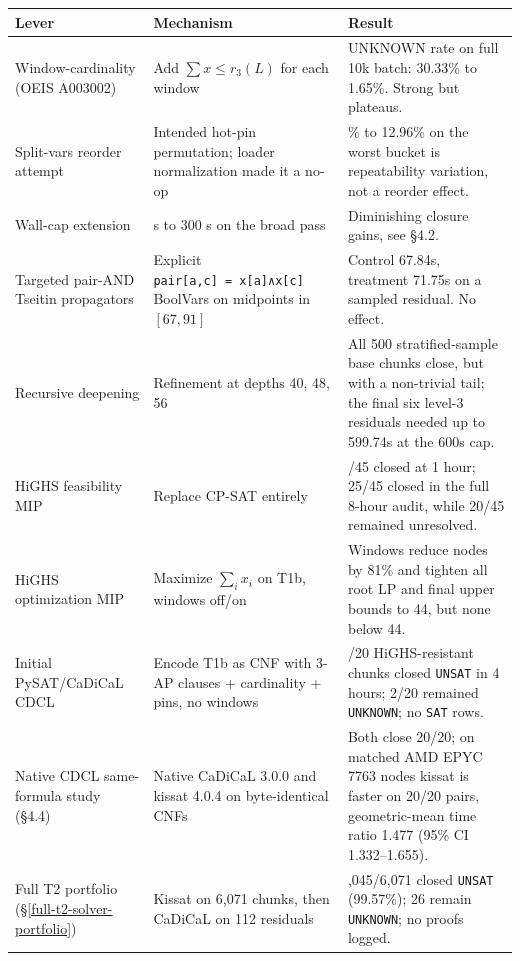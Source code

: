 {\def\LTcaptype{none} %
\begin{longtable}[]{@{}
  >{\raggedright\arraybackslash}p{}
  >{\raggedright\arraybackslash}p{}
  >{\raggedright\arraybackslash}p{}@{}}
\toprule\noalign{}
Lever & Mechanism & Result \\
\midrule\noalign{}
\endhead
\bottomrule\noalign{}
\endlastfoot
Window-cardinality (OEIS A003002) & Add $\sum x \leq r_3(L)$ for each window & UNKNOWN rate on full 10k batch: 30.33\% to 1.65\%. Strong but plateaus. \\
Split-vars reorder attempt & Intended hot-pin permutation; loader normalization made it a no-op & 13.60\% to 12.96\% on the worst bucket is repeatability variation, not a reorder effect. \\
Wall-cap extension & 60 s to 300 s on the broad pass & Diminishing closure gains, see §4.2. \\
Targeted pair-AND Tseitin propagators & Explicit \texttt{pair{[}a,c{]}\ =\ x{[}a{]}∧x{[}c{]}} BoolVars on midpoints in $[67, 91]$ & Control 67.84s, treatment 71.75s on a sampled residual. No effect. \\
Recursive deepening & Refinement at depths 40, 48, 56 & All 500 stratified-sample base chunks close, but with a non-trivial tail; the final six level-3 residuals needed up to 599.74s at the 600s cap. \\
HiGHS feasibility MIP & Replace CP-SAT entirely & 0/45 closed at 1 hour; 25/45 closed in the full 8-hour audit, while 20/45 remained unresolved. \\
HiGHS optimization MIP & Maximize $\sum_i x_i$ on T1b, windows off/on & Windows reduce nodes by 81\% and tighten all root LP and final upper bounds to 44, but none below 44. \\
Initial PySAT/CaDiCaL CDCL & Encode T1b as CNF with 3-AP clauses + cardinality + pins, no windows & 18/20 HiGHS-resistant chunks closed \texttt{UNSAT} in 4 hours; 2/20 remained \texttt{UNKNOWN}; no \texttt{SAT} rows. \\
Native CDCL same-formula study (§4.4) & Native CaDiCaL 3.0.0 and kissat 4.0.4 on byte-identical CNFs & Both close 20/20; on matched AMD EPYC 7763 nodes kissat is faster on 20/20 pairs, geometric-mean time ratio 1.477 (95\% CI 1.332--1.655). \\
Full T2 portfolio (§\ref{full-t2-solver-portfolio}) & Kissat on 6,071 chunks, then CaDiCaL on 112 residuals & 6,045/6,071 closed \texttt{UNSAT} (99.57\%); 26 remain \texttt{UNKNOWN}; no proofs logged. \\
\end{longtable}
}

